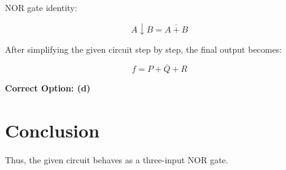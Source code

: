\documentclass[12pt,a4paper]{article}
\begin{document}
NOR gate identity:

\[
A \downarrow B = \overline{A+B}
\]

After simplifying the given circuit step by step, the final output becomes:

\[
f = \overline{P+Q+R}
\]

\vspace{0.5cm}

\textbf{Correct Option: (d)}

\vspace{0.5cm}

\section*{Conclusion}

Thus, the given circuit behaves as a three-input NOR gate.
\end{document}

